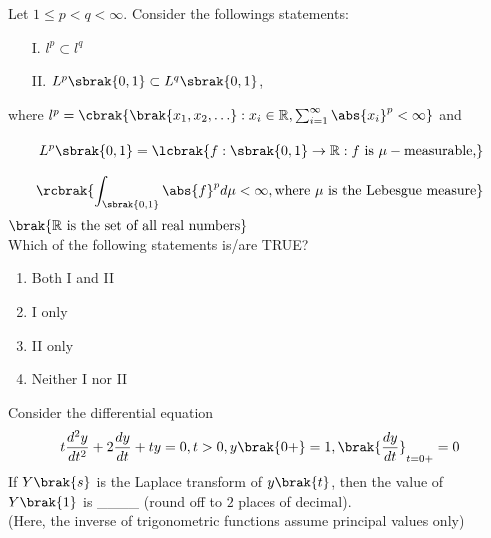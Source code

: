 \iffalse
\chapter{2019}
\author{AI24BTECH11015 - Harshvardhan Patidar}
\section{ma}
\fi
    \item Let $1 \leq p < q < \infty$. Consider the followings statements: 
        \begin{itemize}
            \item [I.] $l^p \subset l^q$
            \item [II.] $L^p \sbrak{0,1} \subset L^q\sbrak{0,1}$,
        \end{itemize}

        where $l^p = \cbrak{\brak{x_1,x_2, \ldots} : x_i \in \mathbb{R}, \sum_{i=1}^{\infty} \abs{x_i}^p < \infty}$ and 
        \begin{align*}
            L^p \sbrak{0,1} = \lcbrak{f:\sbrak{0,1} \rightarrow \mathbb{R}:f \text{ is } \mu-\text{measurable,} \vphantom{\int_{1}^{0}}} \\  \vphantom{\int_{1}^{0}} \rcbrak{\int_{\sbrak{0,1}} \abs{f}^p d \mu < \infty, \text{where } \mu \text{ is the Lebesgue measure}}
        \end{align*}
        $\brak{\mathbb{R} \text{ is the set of all real numbers}}$\\
        Which of the following statements is/are TRUE?

        \begin{enumerate}
            \item Both I and II
            \item I only
            \item II only
            \item Neither I nor II
        \end{enumerate}

        \item Consider the differential equation 
            \begin{align*}
                t \frac{d^2 y}{dt^2} + 2 \frac{dy}{dt} + ty = 0, t>0, y\brak{0+} = 1, \brak{\frac{dy}{dt}}_{t=0+} = 0
            \end{align*}
            If $Y\brak{s}$ is the Laplace transform of $y\brak{t}$, then the value of $Y\brak{1}$ is \_\_\_\_ (round off to $2$ places of decimal). \\
            (Here, the inverse of trigonometric functions assume principal values only)

